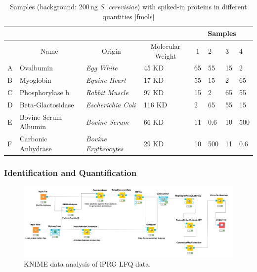 \renewcommand{\arraystretch}{1.2} %
\begin{table}[!ht]
\centering
\small
\caption{Samples (background: 200\,ng \emph{S. cerevisiae}) with spiked-in proteins in different quantities [fmols]}
\label{t:dataset_iPRG}
\begin{tabular}{llll|llll}
  &                          &                              &                                      & \multicolumn{4}{c}{Samples}            \\
\hline 
  & \multicolumn{1}{c}{Name} & \multicolumn{1}{c}{Origin}   & \multicolumn{1}{c}{Molecular Weight} & \multicolumn{1}{c}{1} & 2   & 3  & 4   \\
\hline
\hline
A & Ovalbumin                & \textit{Egg White}   & 45 KD                                 & 65                    & 55  & 15 & 2   \\
\hline
B & Myoglobin                & \textit{Equine Heart}        & 17 KD                                 & 55                    & 15  & 2  & 65  \\
\hline
C & Phosphorylase b          & \textit{Rabbit Muscle}       & 97 KD                                 & 15                    & 2   & 65 & 55  \\
\hline
D & Beta-Glactosidase        & \textit{Escherichia Coli}    & 116 KD                                & 2                     & 65  & 55 & 15  \\
\hline
\hline
E & Bovine Serum Albumin     & \textit{Bovine Serum}        & 66 KD                                 & 11                    & 0.6 & 10 & 500 \\
\hline
F & Carbonic Anhydrase       & \textit{Bovine Erythrocytes} & 29 KD                                 & 10                    & 500 & 11 & 0.6 \\
\hline
\end{tabular}
\end{table}

\subsubsection{Identification and Quantification}

\begin{figure}[htbp]
  \centering
  \includegraphics[width=1\textwidth]{graphics/labelfree/iPRG/iPRG_lfq.png}
  \caption{KNIME data analysis of iPRG LFQ data.}
  \label{fig:iPRG_lfq}
\end{figure}

